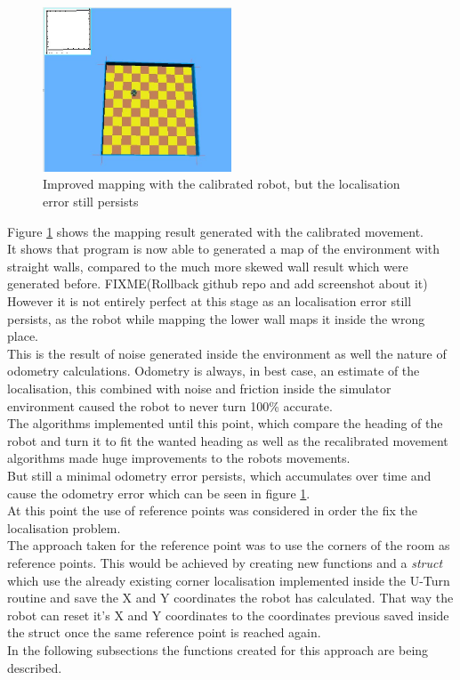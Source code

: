 \begin{figure}[h]
\centering
\includegraphics[width = 0.5\textwidth]{../../figures/odometry_error} 
\caption{Improved mapping with the calibrated robot, but the localisation error still persists}
\label{odometry_error}
\end{figure}

Figure \ref{odometry_error} shows the mapping result generated with the calibrated movement.\\
It shows that program is now able to generated a map of the environment with straight walls, compared to the much more skewed wall result which were generated before. 
FIXME(Rollback github repo and add screenshot about it)\\

However it is not entirely perfect at this stage as an localisation error still persists, as the robot while mapping the lower wall maps it inside the wrong place. \\
This is the result of noise generated inside the environment as well the nature of odometry calculations.
Odometry is always, in best case, an estimate of the localisation, this combined with noise and friction inside the simulator environment caused the robot to never turn 100\% accurate. \\
The algorithms implemented until this point, which compare the heading of the robot and turn it to fit the wanted heading as well as the recalibrated movement algorithms made huge improvements to the robots movements.\\
But still a minimal odometry error persists, which accumulates over time and cause the odometry error which can be seen in figure \ref{odometry_error}. \\[3ex]

At this point the use of reference points was considered in order the fix the localisation problem.\\
The approach taken for the reference point was to use the corners of the room as reference points.
This would be achieved by creating new functions and a \textit{struct }which use the already existing corner localisation implemented inside the U-Turn routine and save the X and Y coordinates the robot has calculated. 
That way the robot can reset it's X and Y coordinates to the coordinates previous saved inside the struct once the same reference point is reached again.\\
In the following subsections the functions created for this approach are being described.

